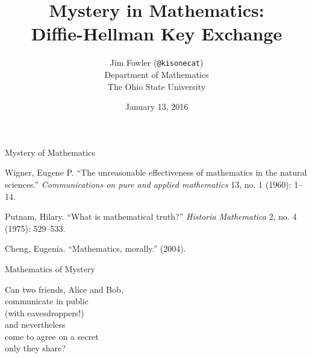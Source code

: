 \documentclass[14pt,aspectratio=169]{beamer}
\author{Jim Fowler (\texttt{@kisonecat})\\ Department of Mathematics \\ The Ohio State University}
\date{January 13, 2016}
\title{Mystery in Mathematics: \\ Diffie-Hellman Key Exchange}
\begin{document}
\begin{frame}
\maketitle
\end{frame}

\begin{frame}
  \Huge

  \begin{center}
    Mystery of Mathematics
  \end{center}
\end{frame}

\begin{frame}
\hangindent=0.7cm Wigner, Eugene P. ``The unreasonable effectiveness of mathematics in the natural sciences.'' \textit{Communications on pure and applied mathematics} 13, no. 1 (1960): 1--14.

\vfill

\hangindent=0.7cm Putnam, Hilary. ``What is mathematical truth?'' \textit{Historia Mathematica} 2, no. 4 (1975): 529--533.

\vfill

\hangindent=0.7cm Cheng, Eugenia. ``Mathematics, morally.'' (2004).
\end{frame}

\begin{frame}
  \Huge

  \begin{center}
    Mathematics of Mystery 
  \end{center}
\end{frame}


\begin{frame}
  \huge

  Can two friends, Alice and Bob, \\
  \quad communicate in public \\
  \quad \quad (with eavesdroppers!) \\
  and nevertheless \\
  \quad come to agree on a secret \\
  \quad only they share?
\end{frame}

\newcommand{\swatch}[1]{\textcolor{#1}{\rule{12pt}{12pt}}}

\newcommand{\aliceroombob}[3]{%
  \begin{tabular}{@{}p{0.33\textwidth}@{}p{0.33\textwidth}@{}p{0.33\textwidth}@{}}
    \begin{center}#1\end{center} & \begin{center}#2\end{center} & \begin{center}#3\end{center} 
  \end{tabular}\\[-6ex]}
\end{document}

